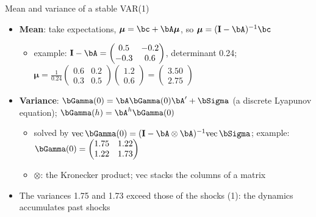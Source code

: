 \begin{frame}{Mean and variance of a stable VAR(1)}
\itemsize{\small}
\begin{itemize}
    \item \textbf{Mean}: take expectations, $\boldsymbol{\mu} = \bc + \bA\boldsymbol{\mu}$, so $\boldsymbol{\mu} = (\mathbf{I} - \bA)^{-1}\bc$
    \begin{itemize}
        \item example: $\mathbf{I} - \bA = \begin{pmatrix} 0.5 & -0.2 \\ -0.3 & 0.6 \end{pmatrix}$, determinant 0.24; $\boldsymbol{\mu} = \frac{1}{0.24}\begin{pmatrix} 0.6 & 0.2 \\ 0.3 & 0.5 \end{pmatrix}\begin{pmatrix} 1.2 \\ 0.6 \end{pmatrix} = \begin{pmatrix} 3.50 \\ 2.75 \end{pmatrix}$
    \end{itemize}
    \item \textbf{Variance}: $\bGamma(0) = \bA\bGamma(0)\bA' + \bSigma$ (a discrete Lyapunov equation); $\bGamma(h) = \bA^h\bGamma(0)$
    \begin{itemize}
        \item solved by $\mathrm{vec}\,\bGamma(0) = (\mathbf{I} - \bA \otimes \bA)^{-1}\mathrm{vec}\,\bSigma$; example: $\bGamma(0) = \begin{pmatrix} 1.75 & 1.22 \\ 1.22 & 1.73 \end{pmatrix}$
        \item $\otimes$: the Kronecker product; $\mathrm{vec}$ stacks the columns of a matrix
    \end{itemize}
    \item The variances 1.75 and 1.73 exceed those of the shocks (1): the dynamics accumulates past shocks
\end{itemize}
\end{frame}

